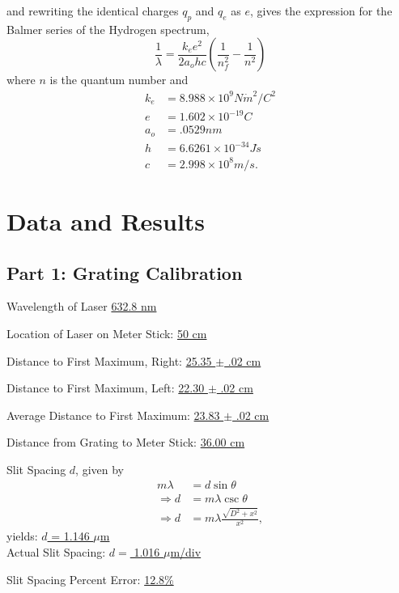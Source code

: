 \documentclass[twocolumn,english]{IEEEtran}
\theoremstyle{plain}
\theoremstyle{plain}
\begin{document}
and rewriting the identical charges $q_p$ and $q_e$ as $e$, gives the expression for the Balmer series of the Hydrogen spectrum,
\begin{equation}
	\frac{1}{\lambda} = \frac{k_e e^2}{2a_o h c}\left( \frac{1}{n_f^2} - \frac{1}{n^2}\right)
\end{equation}
where $n$ is the quantum number and
\begin{align*}
k_e &= 8.988\times10^9 N\dot m^2/C^2 \\
e&= 1.602\times 10^{-19} C \\
a_o &= .0529 nm \\
h&=6.6261\times 10^{-34}J\dot s \\
c&=2.998\times10^8 m/s.
\end{align*}


\noindent\hrulefill

\section{Data and Results}
\subsection{Part 1: Grating Calibration}

Wavelength of Laser \hfill\underline{632.8 nm}

Location of Laser on Meter Stick: \hfill\underline{50 cm}

Distance to First Maximum, Right: \hfill\underline{25.35 $\pm$ .02 cm}

Distance to First Maximum, Left: \hfill\underline{22.30 $\pm$ .02 cm}

Average Distance to First Maximum: \hfill\underline{23.83 $\pm$ .02 cm}

Distance from Grating to Meter Stick: \hfill\underline{36.00 cm}

Slit Spacing $d$, given by
\begin{align*}
	m\lambda &= d\sin\theta \\
	\Rightarrow d &= m\lambda\csc\theta \\
	\Rightarrow d &= m\lambda\frac{\sqrt{D^2 + x^2}}{x^2},
\end{align*}
yields: \hfill\underline{$d$ = 1.146 $\mu$m} \\


Actual Slit Spacing: \hfill\underline{$d =$ 1.016 $\mu$m/div}

Slit Spacing Percent Error: \hfill\underline{12.8\%}
\end{document}
